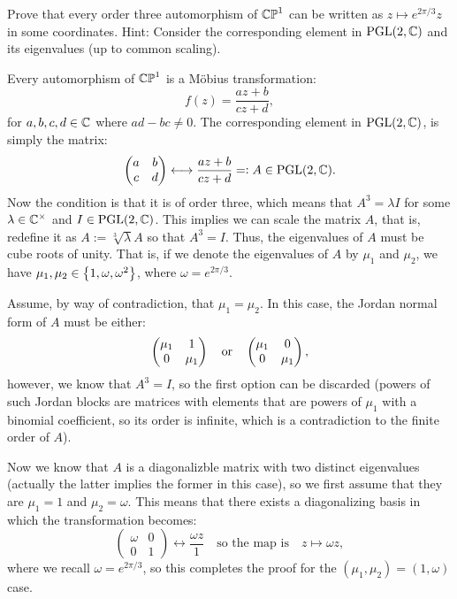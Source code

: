 \documentclass[11pt, a4paper]{article}
\begin{document}
\begin{exercise}
  Prove that every order three automorphism of $\mathbb{CP}^1$ can be written as
  $z \mapsto e^{2\pi/3}z$ in some coordinates.
  Hint: Consider the corresponding element in $\mathrm{PGL}(2,\mathbb{C})$ and its
  eigenvalues (up to common scaling).
\end{exercise}
\begin{solution}
  Every automorphism of $\mathbb{CP}^1$ is a M\"obius transformation:
  \[
    f(z) = \frac{az + b}{cz + d},
  \]
  for $a,b,c,d \in \mathbb{C}$ where $ad - bc \neq 0$.
  The corresponding element in $\mathrm{PGL}(2,\mathbb{C})$,
  is simply the matrix:
  \[
    \begin{pmatrix}
      a & b \\
      c & d
    \end{pmatrix} \longleftrightarrow
    \frac{az + b}{cz + d} =: A \in \mathrm{PGL}(2,\mathbb{C}).
  \]
  Now the condition is that it is of order three,
  which means that $A^{3} = \lambda I$ for some $\lambda \in \mathbb{C}^{\times}$
  and $I \in \mathrm{PGL}(2,\mathbb{C})$.
  This implies we can scale the matrix $A$,
  that is, redefine it as $A := \sqrt[3]{\lambda} A$ so that
  $A^{3} = I$.
  Thus, the eigenvalues of $A$
  must be cube roots of unity.
  That is, if we denote the eigenvalues of $A$ by $\mu_1$ and $\mu_2$,
  we have $\mu_1,\mu_2 \in \left\{1,\omega,\omega^2\right\}$,
  where $\omega = e^{2\pi/3}$.
  
  Assume, by way of contradiction, that $\mu_1 = \mu_2$.
  In this case, the Jordan normal form of $A$ must be
  either:
  \[
    \begin{pmatrix}
      \mu_1 & 1 \\
      0 & \mu_1
    \end{pmatrix} \quad \text{or} \quad
    \begin{pmatrix}
      \mu_1 & 0 \\
      0 & \mu_1
    \end{pmatrix},
  \]
  however, we know that $A^3 = I$,
  so the first option can be discarded (powers of such Jordan
  blocks are matrices with elements that are powers of $\mu_1$
  with a binomial coefficient, so its order is infinite, which is
  a contradiction to the finite order of $A$).

  Now we know that $A$ is a diagonalizble matrix with two distinct
  eigenvalues (actually the latter implies the former in this case),
  so we first assume
  that they are $\mu_1 = 1$ and $\mu_2 = \omega$.
  This means that there exists a diagonalizing basis in which
  the transformation becomes:
  \[
    \begin{pmatrix}
      \omega & 0 \\
      0 & 1
    \end{pmatrix} \longleftrightarrow
    \frac{\omega z}{1} \quad \text{so the map is} \quad
    z \mapsto \omega z,
  \]
  where we recall $\omega = e^{2\pi/3}$,
  so this completes the proof for the $(\mu_1, \mu_2) = (1,\omega)$ case.


\end{solution}
\end{document}
